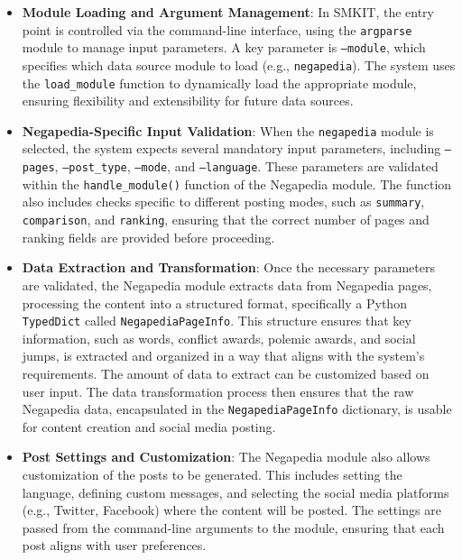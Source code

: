 \begin{itemize}
    \item \textbf{Module Loading and Argument Management}: In SMKIT, the entry point is controlled via the command-line interface, using the \texttt{argparse} module to manage input parameters. A key parameter is \texttt{--module}, which specifies which data source module to load (e.g., \texttt{negapedia}). The system uses the \texttt{load\_module} function to dynamically load the appropriate module, ensuring flexibility and extensibility for future data sources.
    
    \item \textbf{Negapedia-Specific Input Validation}: When the \texttt{negapedia} module is selected, the system expects several mandatory input parameters, including \texttt{--pages}, \texttt{--post\_type}, \texttt{--mode}, and \texttt{--language}. These parameters are validated within the \texttt{handle\_module()} function of the Negapedia module. The function also includes checks specific to different posting modes, such as \texttt{summary}, \texttt{comparison}, and \texttt{ranking}, ensuring that the correct number of pages and ranking fields are provided before proceeding.

    \item \textbf{Data Extraction and Transformation}: Once the necessary parameters are validated, the Negapedia module extracts data from Negapedia pages, processing the content into a structured format, specifically a Python \texttt{TypedDict} called \texttt{NegapediaPageInfo}. This structure ensures that key information, such as words, conflict awards, polemic awards, and social jumps, is extracted and organized in a way that aligns with the system’s requirements. The amount of data to extract can be customized based on user input. The data transformation process then ensures that the raw Negapedia data, encapsulated in the \texttt{NegapediaPageInfo} dictionary, is usable for content creation and social media posting.
    
    \item \textbf{Post Settings and Customization}: The Negapedia module also allows customization of the posts to be generated. This includes setting the language, defining custom messages, and selecting the social media platforms (e.g., Twitter, Facebook) where the content will be posted. The settings are passed from the command-line arguments to the module, ensuring that each post aligns with user preferences.


\end{itemize}
